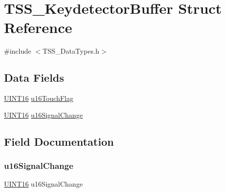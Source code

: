 \hypertarget{struct_t_s_s___keydetector_buffer}{}\section{T\+S\+S\+\_\+\+Keydetector\+Buffer Struct Reference}
\label{struct_t_s_s___keydetector_buffer}


{\ttfamily \#include $<$T\+S\+S\+\_\+\+Data\+Types.\+h$>$}

\subsection*{Data Fields}
\begin{DoxyCompactItemize}
\item 
\hyperlink{_t_s_s___data_types_8h_a09f1a1fb2293e33483cc8d44aefb1eb1}{U\+I\+N\+T16} \hyperlink{struct_t_s_s___keydetector_buffer_a9a2410dad2d56389b26fbbb39a3b31ce}{u16\+Touch\+Flag}
\item 
\hyperlink{_t_s_s___data_types_8h_a09f1a1fb2293e33483cc8d44aefb1eb1}{U\+I\+N\+T16} \hyperlink{struct_t_s_s___keydetector_buffer_a103796d8cd3febc63378ec4e72bdabba}{u16\+Signal\+Change}
\end{DoxyCompactItemize}


\subsection{Field Documentation}
\mbox{\label{struct_t_s_s___keydetector_buffer_a103796d8cd3febc63378ec4e72bdabba}} 
\subsubsection{\texorpdfstring{u16\+Signal\+Change}{u16SignalChange}}
{\footnotesize\ttfamily \hyperlink{_t_s_s___data_types_8h_a09f1a1fb2293e33483cc8d44aefb1eb1}{U\+I\+N\+T16} u16\+Signal\+Change}

\mbox{\label{struct_t_s_s___keydetector_buffer_a9a2410dad2d56389b26fbbb39a3b31ce}} 
